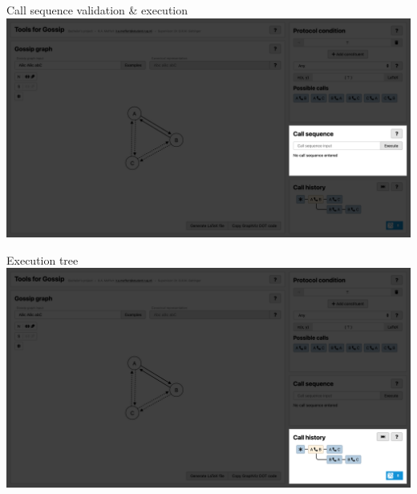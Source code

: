 \documentclass[aspectratio=169]{beamer}
\begin{document}
\begin{frame}[t]{Call sequence validation \& execution}
    \includegraphics[width=\linewidth]{images/tool-sequence.png}
\end{frame}
\begin{frame}[t]{Execution tree}
    \includegraphics[width=\linewidth]{images/tool-history.png}
\end{frame}
\end{document}
